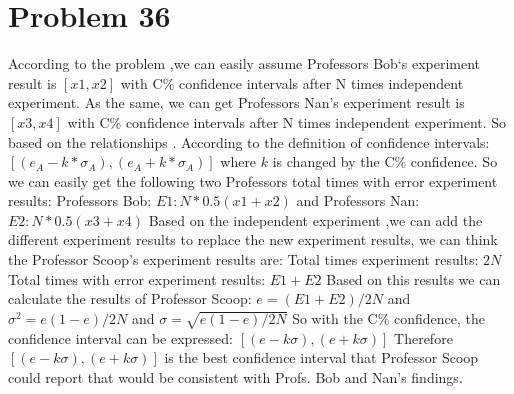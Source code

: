 \documentclass[12pt]{article}
\begin{document}
\section{Problem 36}
According to the problem ,we can easily assume Professors Bob‘s experiment result is $[ x1 , x2 ]$ with C\% confidence intervals after N times independent experiment. As the same, we can get Professors Nan’s experiment result is $[ x3 , x4 ]$ with C\% confidence intervals after N times independent experiment. So based on the relationships . According to the definition of confidence intervals:\newline
$[(e_{A} - k * \sigma_{A}), (e_{A} + k * \sigma_{A}) ]$ where $k$ is changed by the C\% confidence.\newline
So we can easily get the following two Professors total times with error experiment results:\newline
Professors Bob: $E1: N * 0.5(x1 + x2)$ and Professors Nan: $E2: N * 0.5(x3 + x4)$\newline
Based on the independent experiment ,we can add the different experiment results to replace the new experiment results, we can think the Professor Scoop’s experiment results are:\newline
Total times experiment results: $2N$\newline
Total times with error experiment results: $E1 + E2$\newline
Based on this results we can calculate the results of Professor Scoop:\newline
$e = (E1 + E2) / 2N$ and $\sigma^2 = e(1 - e) / 2N$ and $\sigma = \sqrt{e(1 - e) / 2N}$\newline
So with the C\% confidence, the confidence interval can be expressed:\newline
$[(e - k\sigma), (e+k\sigma)]$\newline
Therefore $[(e - k\sigma), (e+k\sigma)]$ is the best confidence interval that Professor Scoop could report that would be consistent with Profs. Bob and Nan’s findings.


% 
% 
\end{document}
